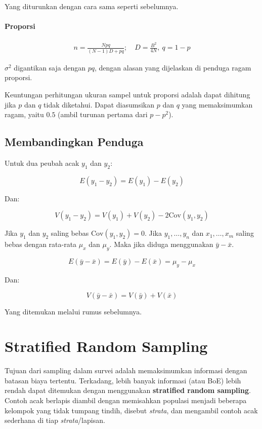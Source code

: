 \documentclass[
  letterpaper,
  DIV=11,
  numbers=noendperiod]{scrreprt}
\begin{document}
Yang diturunkan dengan cara sama seperti sebelumnya.

\hypertarget{proporsi-2}{%
\subsubsection{Proporsi}\label{proporsi-2}}

\[
\begin{aligned}
n=\frac{Npq}{(N-1)D+pq}; \quad D=\frac{B^2}{4N}, \ q=1-p
\end{aligned}
\]

\(\sigma^2\) digantikan saja dengan \(pq\), dengan alasan yang
dijelaskan di penduga ragam proporsi.

Keuntungan perhitungan ukuran sampel untuk proporsi adalah dapat
dihitung jika \(p\) dan \(q\) tidak diketahui. Dapat diasumsikan \(p\)
dan \(q\) yang memaksimumkan ragam, yaitu \(0.5\) (ambil turunan pertama
dari \(p-p^2\)).

\hypertarget{membandingkan-penduga}{%
\section{Membandingkan Penduga}\label{membandingkan-penduga}}

Untuk dua peubah acak \(y_1\) dan \(y_2\):

\[
E(y_1-y_2)=E(y_1)-E(y_2)
\]

Dan:

\[
V(y_1-y_2)=V(y_1)+V(y_2)-2\mathrm{Cov}(y_1,y_2)
\]

Jika \(y_1\) dan \(y_2\) saling bebas \(\mathrm{Cov}(y_1,y_2)=0\). Jika
\(y_1, \ldots, y_n\) dan \(x_1, \ldots, x_m\) saling bebas dengan
rata-rata \(\mu_x\) dan \(\mu_y\). Maka jika diduga menggunakan
\(\bar{y}-\bar{x}\).

\[
E(\bar{y}-\bar{x})=E(\bar{y})-E(\bar{x})=\mu_y-\mu_x
\]

Dan:

\[
V(\bar{y}-\bar{x})=V(\bar{y})+V(\bar{x})
\]

Yang ditemukan melalui rumus sebelumnya.


\hypertarget{stratified-random-sampling}{%
\chapter{Stratified Random Sampling}\label{stratified-random-sampling}}

Tujuan dari sampling dalam survei adalah memaksimumkan informasi dengan
batasan biaya tertentu. Terkadang, lebih banyak informasi (atau BoE)
lebih rendah dapat ditemukan dengan menggunakan \textbf{stratified
random sampling}. Contoh acak berlapis diambil dengan memisahkan
populasi menjadi beberapa kelompok yang tidak tumpang tindih, disebut
\emph{strata}, dan mengambil contoh acak sederhana di tiap
\emph{strata}/lapisan.
\end{document}
